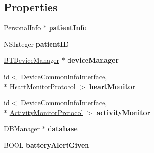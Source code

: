 \subsection*{Properties}
\begin{DoxyCompactItemize}
\item 
\hypertarget{interface_device_poll_manager_a8739ffcaa2b1e02afc1864e338de148f}{\hyperlink{interface_personal_info}{Personal\-Info} $\ast$ {\bfseries patient\-Info}}\label{interface_device_poll_manager_a8739ffcaa2b1e02afc1864e338de148f}

\item 
\hypertarget{interface_device_poll_manager_a621e3962372201145248997e2eb87327}{N\-S\-Integer {\bfseries patient\-I\-D}}\label{interface_device_poll_manager_a621e3962372201145248997e2eb87327}

\item 
\hypertarget{interface_device_poll_manager_a813e014763804b71e247ca335fe91761}{\hyperlink{interface_b_t_device_manager}{B\-T\-Device\-Manager} $\ast$ {\bfseries device\-Manager}}\label{interface_device_poll_manager_a813e014763804b71e247ca335fe91761}

\item 
\hypertarget{interface_device_poll_manager_a5d06bcab588b72afdf5fce4c102afe91}{id$<$ \hyperlink{protocol_device_common_info_interface-p}{Device\-Common\-Info\-Interface}, \\*
\hyperlink{protocol_heart_monitor_protocol-p}{Heart\-Monitor\-Protocol} $>$ {\bfseries heart\-Monitor}}\label{interface_device_poll_manager_a5d06bcab588b72afdf5fce4c102afe91}

\item 
\hypertarget{interface_device_poll_manager_a1e33e8f7da83c22dccb6c3b3b7d66069}{id$<$ \hyperlink{protocol_device_common_info_interface-p}{Device\-Common\-Info\-Interface}, \\*
\hyperlink{protocol_activity_monitor_protocol-p}{Activity\-Monitor\-Protocol} $>$ {\bfseries activity\-Monitor}}\label{interface_device_poll_manager_a1e33e8f7da83c22dccb6c3b3b7d66069}

\item 
\hypertarget{interface_device_poll_manager_a66a02f95a478a42c7e45986317e3c6c1}{\hyperlink{interface_d_b_manager}{D\-B\-Manager} $\ast$ {\bfseries database}}\label{interface_device_poll_manager_a66a02f95a478a42c7e45986317e3c6c1}

\item 
\hypertarget{interface_device_poll_manager_a8d5b5ff2c336f0dd2cb2b9e088850072}{B\-O\-O\-L {\bfseries battery\-Alert\-Given}}\label{interface_device_poll_manager_a8d5b5ff2c336f0dd2cb2b9e088850072}


\end{DoxyCompactItemize}
